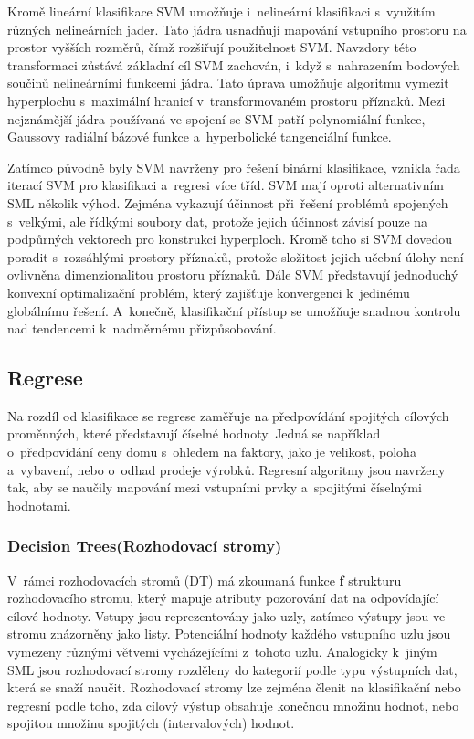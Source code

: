 Kromě lineární klasifikace SVM umožňuje i~nelineární klasifikaci s~využitím různých nelineárních jader. Tato jádra usnadňují mapování vstupního prostoru na prostor vyšších rozměrů, čímž rozšiřují použitelnost SVM. Navzdory této transformaci zůstává základní cíl SVM zachován, i~když s~nahrazením bodových součinů nelineárními funkcemi jádra. Tato úprava umožňuje algoritmu vymezit hyperplochu s~maximální hranicí v~transformovaném prostoru příznaků. Mezi nejznámější jádra používaná ve spojení se SVM patří polynomiální funkce, Gaussovy radiální bázové funkce a~hyperbolické tangenciální funkce.

Zatímco původně byly SVM navrženy pro řešení binární klasifikace, vznikla řada iterací SVM pro klasifikaci a~regresi více tříd. SVM mají oproti alternativním SML několik výhod. Zejména vykazují účinnost při~řešení problémů spojených s~velkými, ale řídkými soubory dat, protože jejich účinnost závisí pouze na podpůrných vektorech pro konstrukci hyperploch. Kromě toho si SVM dovedou poradit s~rozsáhlými prostory příznaků, protože složitost jejich učební úlohy není ovlivněna dimenzionalitou prostoru příznaků. Dále SVM představují jednoduchý konvexní optimalizační problém, který zajišťuje konvergenci k~jedinému globálnímu řešení. A~konečně, klasifikační přístup se  umožňuje snadnou kontrolu nad tendencemi k~nadměrnému přizpůsobování.

\newpage

\subsection{Regrese}
Na rozdíl od klasifikace se regrese zaměřuje na předpovídání spojitých cílových proměnných, které představují číselné hodnoty. Jedná se například o~předpovídání ceny domu s~ohledem na faktory, jako je velikost, poloha a~vybavení, nebo o~odhad prodeje výrobků. Regresní algoritmy jsou navrženy tak, aby se naučily mapování mezi vstupními prvky a~spojitými číselnými hodnotami.

\subsubsection{Decision Trees(Rozhodovací stromy)}
V~rámci rozhodovacích stromů (DT)\cite{Breiman2017} má zkoumaná funkce \textbf{f} strukturu rozhodovacího stromu, který mapuje atributy pozorování dat na odpovídající cílové hodnoty. Vstupy jsou reprezentovány jako uzly, zatímco výstupy jsou ve stromu znázorněny jako listy. Potenciální hodnoty každého vstupního uzlu jsou vymezeny různými větvemi vycházejícími z~tohoto uzlu. Analogicky k~jiným SML jsou rozhodovací stromy rozděleny do kategorií podle typu výstupních dat, která se snaží naučit. Rozhodovací stromy lze zejména členit na klasifikační nebo regresní podle toho, zda cílový výstup obsahuje konečnou množinu hodnot, nebo spojitou množinu spojitých (intervalových) hodnot.

